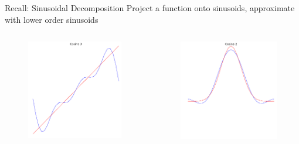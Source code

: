 \documentclass{beamer}
\begin{document}
\begin{frame}{Recall: Sinusoidal Decomposition}
Project a function onto sinusoids, approximate with lower order sinusoids

\begin{columns}
\begin{column}[T]{5cm}
\begin{figure}[t]
    \includegraphics[width=\textwidth]{Sawtooth.png}
\end{figure}
\end{column}
\begin{column}[T]{5cm}
\begin{figure}[t]
    \includegraphics[width=\textwidth]{Gaussian.png}

\end{figure}
\end{column}
\end{columns}
\end{frame}
\end{document}

